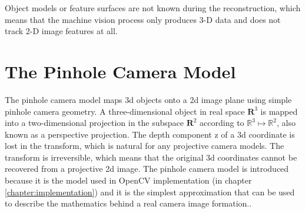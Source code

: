 \documentclass[12pt,a4paper,oneside,pdftex]{report}
\begin{document}

Object models or feature surfaces are not known during the reconstruction, which means that the machine vision process only produces 3-D data and does not track 2-D image features at all. 


\section{The Pinhole Camera Model}
\label{section:the_pinhole_camera_model}

The pinhole camera model maps 3d objects onto a 2d image plane using simple pinhole camera geometry. A three-dimensional object in real space $\mathbf{R}^3$ is mapped into a two-dimensional projection in the subspace $\mathbf{R}^2$ according to $\mathbb{R}^3 \mapsto \mathbb{R}^2$, also known as a perspective projection. The depth component z of a 3d coordinate is lost in the transform, which is natural for any projective camera models. The transform is irreversible, which means that the original 3d coordinates cannot be recovered from a projective 2d image. The pinhole camera model is introduced because it is the model used in OpenCV implementation (in chapter \ref{chapter:implementation}) and it is the simplest approximation that can be used to describe the mathematics behind a real camera image formation.\citep{Sonka07, OpenCVWeb}.

\end{document}
